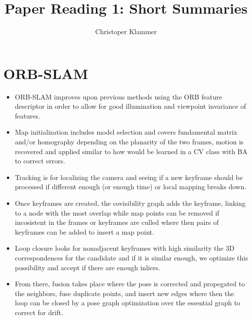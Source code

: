 \documentclass[a4paper]{article}
\title{Paper Reading 1: Short Summaries}
\author{Christoper Klammer}
\begin{document}
\maketitle
\section{ORB-SLAM}

\begin{itemize}
    \item ORB-SLAM improves upon previous methods using the ORB feature descriptor in order to allow for good illumination and viewpoint invariance of features.
    \item Map initialization includes model selection and covers fundamental matrix and/or homography depending on the planarity of the two frames, motion is recovered and applied similar to how would be learned in a CV class with BA to correct errors.
    \item Tracking is for localizing the camera and seeing if a new keyframe should be processed if different enough (or enough time) or local mapping breaks down. 
    \item Once keyframes are created, the covisibility graph adds the keyframe, linking to a node with the most overlap while map points can be removed if incosistent in the frames or keyframes are culled where then pairs of keyframes can be added to insert a map point.
    \item Loop closure looks for nonadjacent keyframes with high similarity the 3D correspondences for the candidate and if it is similar enough, we optimize this possibility and accept if there are enough inliers.
    \item From there, fusion takes place where the pose is corrected and propegated to the neighbors, fuse duplicate points, and insert new edges where then the loop can be closed by a pose graph optimization over the essential graph to correct for drift.
\end{itemize}
\end{document}
